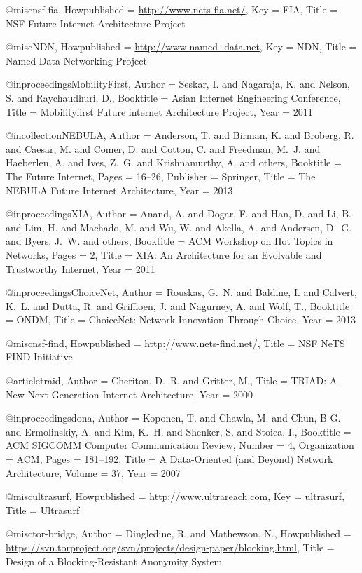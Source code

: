 {{{{{	@misc{nsf-fia,
	Howpublished = {\url{http://www.nets-fia.net/}},
	Key = {FIA},
	Title = {{NSF Future Internet Architecture Project}}}
	
	@misc{NDN,
	Howpublished = {\url{http://www.named- data.net}},
	Key = {NDN},
	Title = {{Named Data Networking Project}}}
	
	@inproceedings{MobilityFirst,
	Author = {Seskar, I. and Nagaraja, K. and Nelson, S. and Raychaudhuri, D.},
	Booktitle = {Asian Internet Engineering Conference},
	Title = {{Mobilityfirst Future internet Architecture Project}},
	Year = {2011}}
	
	@incollection{NEBULA,
	Author = {Anderson, T. and Birman, K. and Broberg, R. and Caesar, M. and Comer, D. and Cotton, C. and Freedman, M.~J. and Haeberlen, A. and Ives, Z.~G. and Krishnamurthy, A. and others},
	Booktitle = {The Future Internet},
	Pages = {16--26},
	Publisher = {Springer},
	Title = {{The NEBULA Future Internet Architecture}},
	Year = {2013}}
	
	@inproceedings{XIA,
	Author = {Anand, A. and Dogar, F. and Han, D. and Li, B. and Lim, H. and Machado, M. and Wu, W. and Akella, A. and Andersen, D.~G. and Byers, J.~W. and others},
	Booktitle = {ACM Workshop on Hot Topics in Networks},
	Pages = {2},
	Title = {{XIA: An Architecture for an Evolvable and Trustworthy Internet}},
	Year = {2011}}
	
	@inproceedings{ChoiceNet,
	Author = {Rouskas, G.~N. and Baldine, I. and Calvert, K.~L. and Dutta, R. and Griffioen, J. and Nagurney, A. and Wolf, T.},
	Booktitle = {ONDM},
	Title = {{ChoiceNet: Network Innovation Through Choice}},
	Year = {2013}}
	
	@misc{nsf-find,
	Howpublished = {http://www.nets-find.net/},
	Title = {{NSF NeTS FIND Initiative}}}
	
	@article{traid,
	Author = {Cheriton, D.~R. and Gritter, M.},
	Title = {{TRIAD: A New Next-Generation Internet Architecture}},
	Year = {2000}}
	
	@inproceedings{dona,
	Author = {Koponen, T. and Chawla, M. and Chun, B-G. and Ermolinskiy, A. and Kim, K.~H. and Shenker, S. and Stoica, I.},
	Booktitle = {ACM SIGCOMM Computer Communication Review},
	Number = {4},
	Organization = {ACM},
	Pages = {181--192},
	Title = {{A Data-Oriented (and Beyond) Network Architecture}},
	Volume = {37},
	Year = {2007}}
	
	@misc{ultrasurf,
	Howpublished = {\url{http://www.ultrareach.com}},
	Key = {ultrasurf},
	Title = {{Ultrasurf}}}
	
	@misc{tor-bridge,
	Author = {Dingledine, R. and Mathewson, N.},
	Howpublished = {\url{https://svn.torproject.org/svn/projects/design-paper/blocking.html}},
	Title = {{Design of a Blocking-Resistant Anonymity System}}}
	
}}}}}
